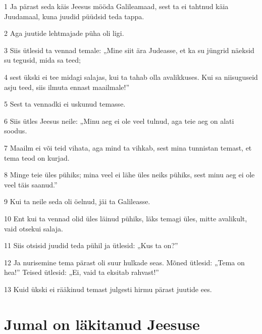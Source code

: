 \par 1 Ja pärast seda käis Jeesus mööda Galileamaad, sest ta ei tahtnud käia Juudamaal, kuna juudid püüdsid teda tappa.
\par 2 Aga juutide lehtmajade püha oli ligi.
\par 3 Siis ütlesid ta vennad temale: „Mine siit ära Judeasse, et ka su jüngrid näeksid su tegusid, mida sa teed;
\par 4 sest ükski ei tee midagi salajas, kui ta tahab olla avalikkuses. Kui sa niisuguseid asju teed, siis ilmuta ennast maailmale!”
\par 5 Sest ta vennadki ei uskunud temasse.
\par 6 Siis ütles Jeesus neile: „Minu aeg ei ole veel tulnud, aga teie aeg on alati soodus.
\par 7 Maailm ei või teid vihata, aga mind ta vihkab, sest mina tunnistan temast, et tema teod on kurjad.
\par 8 Minge teie üles pühiks; mina veel ei lähe üles neiks pühiks, sest minu aeg ei ole veel täis saanud.”
\par 9 Kui ta neile seda oli öelnud, jäi ta Galileasse.
\par 10 Ent kui ta vennad olid üles läinud pühiks, läks temagi üles, mitte avalikult, vaid otsekui salaja.
\par 11 Siis otsisid juudid teda pühil ja ütlesid: „Kus ta on?”
\par 12 Ja nurisemine tema pärast oli suur hulkade seas. Mõned ütlesid: „Tema on hea!” Teised ütlesid: „Ei, vaid ta eksitab rahvast!”
\par 13 Kuid ükski ei rääkinud temast julgesti hirmu pärast juutide ees.

\section*{Jumal on läkitanud Jeesuse}

